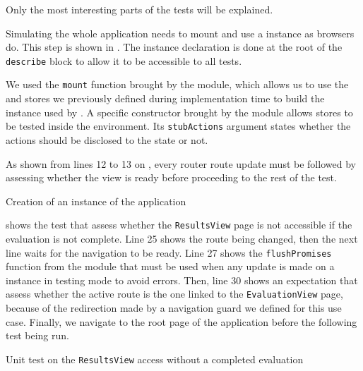 Only the most interesting parts of the tests will be explained.

Simulating the whole application needs to mount and use a  instance as browsers do. This step is shown in . The instance declaration is done at the root of the \texttt{describe} block to allow it to be accessible to all tests.

We used the \texttt{mount} function brought by the  module, which allows us to use the  and  stores we previously defined during implementation time to build the  instance used by . A specific constructor brought by the  module allows  stores to be tested inside the  environment. Its \texttt{stubActions} argument states whether the actions should be disclosed to the state or not.

As shown from lines 12 to 13 on , every router route update must be followed by assessing whether the view is ready before proceeding to the rest of the test.

\begin{listing}[!ht] 
	\caption{Creation of an instance of the  application}
	\label{lst:app_test_path_mount}
\end{listing}

 shows the test that assess whether the \texttt{ResultsView} page is not accessible if the evaluation is not complete. Line 25 shows the route being changed, then the next line waits for the navigation to be ready. Line 27 shows the \texttt{flushPromises} function from the  module that must be used when any update is made on a  instance in testing mode to avoid errors. Then, line 30 shows an expectation that assess whether the active route is the one linked to the \texttt{EvaluationView} page, because of the redirection made by a navigation guard we defined for this use case. Finally, we navigate to the root page of the application before the following test being run.

\begin{listing}[!ht] 
	\caption{Unit test on the \texttt{ResultsView} access without a completed evaluation}
	\label{lst:app_test_path_results}
\end{listing}

